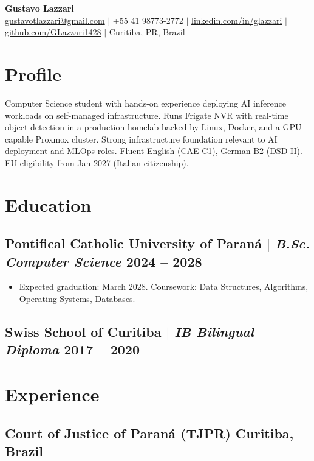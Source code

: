 \documentclass[10.5pt]{article}
\begin{document}
\begin{center}
    {\LARGE\bfseries Gustavo Lazzari} \\
    \vspace{2pt}
    \href{mailto:gustavotlazzari@gmail.com}{gustavotlazzari@gmail.com} $|$
    +55 41 98773-2772 $|$
    \href{https://www.linkedin.com/in/glazzari}{linkedin.com/in/glazzari} $|$
    \href{https://github.com/GLazzari1428}{github.com/GLazzari1428} $|$
    Curitiba, PR, Brazil
\end{center}

\section{Profile}
Computer Science student with hands-on experience deploying AI inference workloads on self-managed
infrastructure. Runs Frigate NVR with real-time object detection in a production homelab backed by
Linux, Docker, and a GPU-capable Proxmox cluster. Strong infrastructure foundation relevant to
AI deployment and MLOps roles. Fluent English (CAE C1), German B2 (DSD II).
EU eligibility from Jan 2027 (Italian citizenship).

\section{Education}
\subsection{Pontifical Catholic University of Paran\'{a} $|$ {\normalfont\itshape B.Sc. Computer Science} \hfill 2024 -- 2028}
\begin{itemize}
    \item Expected graduation: March 2028. Coursework: Data Structures, Algorithms, Operating Systems, Databases.
\end{itemize}
\subsection{Swiss School of Curitiba $|$ {\normalfont\itshape IB Bilingual Diploma} \hfill 2017 -- 2020}

\section{Experience}
\subsection{Court of Justice of Paran\'{a} (TJPR) \hfill Curitiba, Brazil}
\end{document}
